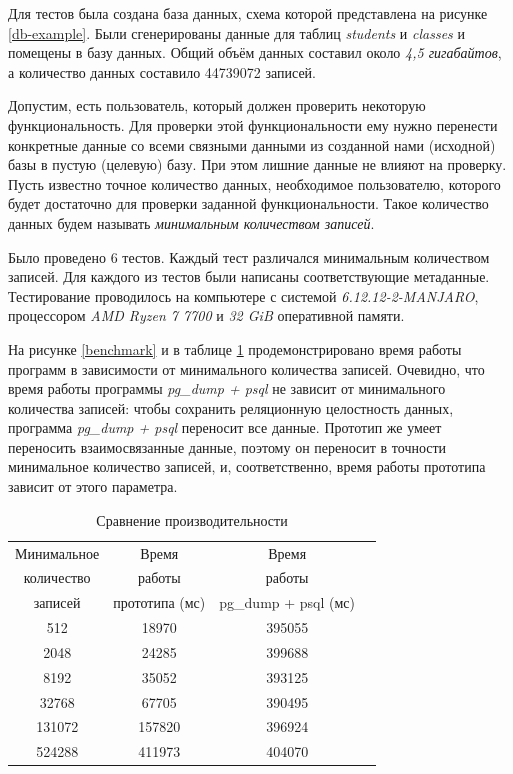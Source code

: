 Для тестов была создана база данных, схема которой представлена на рисунке \ref{db-example}. Были сгенерированы данные для таблиц \textit{students} и \textit{classes} и помещены в базу данных. Общий объём данных составил около \textit{4,5 гигабайтов}, а количество данных составило 44739072 записей.

Допустим, есть пользователь, который должен проверить некоторую функциональность. Для проверки этой функциональности ему нужно перенести конкретные данные со всеми связными данными из созданной нами (исходной) базы в пустую (целевую) базу. При этом лишние данные не влияют на проверку. Пусть известно точное количество данных, необходимое пользователю, которого будет достаточно для проверки заданной функциональности. Такое количество данных будем называть \textit{минимальным количеством записей}.

Было проведено 6 тестов. Каждый тест различался минимальным количеством записей. Для каждого из тестов были написаны соответствующие метаданные. Тестирование проводилось на компьютере с системой \textit{6.12.12-2-MANJARO}, процессором \textit{AMD Ryzen 7 7700} и \textit{32 GiB} оперативной памяти.

На рисунке \ref{benchmark} и в таблице \ref{tab:benchmark} продемонстрировано время работы программ в зависимости от минимального количества записей. Очевидно, что время работы программы \textit{pg\_dump + psql} не зависит от минимального количества записей: чтобы сохранить реляционную целостность данных, программа \textit{pg\_dump + psql} переносит все данные. Прототип же умеет переносить взаимосвязанные данные, поэтому он переносит в точности минимальное количество записей, и, соответственно, время работы прототипа зависит от этого параметра.

\begin{table}[h!]
    \caption{Сравнение производительности}
    \begin{tabular}{|c|c|c|c|}
        \hline
        Минимальное & Время & Время \\
        количество & работы & работы \\
        записей & прототипа (мс) & pg\_dump + psql (мс) \\
        \hline
        512 & 18970 & 395055 \\
        \hline
        2048 & 24285 & 399688 \\
        \hline
        8192 & 35052 & 393125 \\
        \hline
        32768 & 67705 & 390495 \\
        \hline
        131072 & 157820 & 396924 \\
        \hline
        524288 & 411973 & 404070 \\
        \hline
    \end{tabular}
    \label{tab:benchmark}
\end{table}

